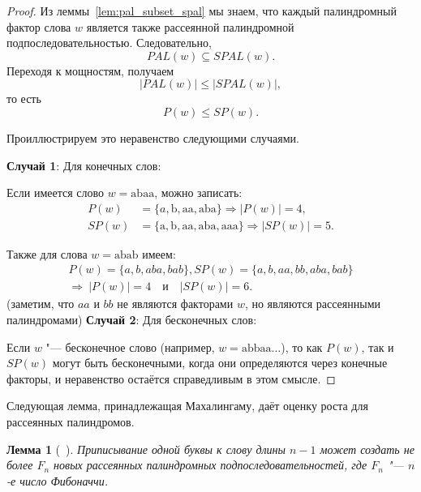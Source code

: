 \documentclass[a4paper,14pt]{extreport}
\theoremstyle{plain}
\newtheorem{lemma}{Лемма}[section]
\theoremstyle{definition}
\theoremstyle{remark}
\begin{document}
\begin{proof}
	Из леммы~\ref{lem:pal_subset_spal} мы знаем, что каждый палиндромный фактор слова $w$ является также рассеянной палиндромной подпоследовательностью. Следовательно,
	\begin{equation}
		PAL(w) \subseteq SPAL(w).
	\end{equation}
	Переходя к мощностям, получаем
	\begin{equation}
		|PAL(w)| \leq |SPAL(w)|,
	\end{equation}
	то есть
	\begin{equation}
		P(w) \leq SP(w).
	\end{equation}
	
	Проиллюстрируем это неравенство следующими случаями.
	
	\textbf{Случай 1}: Для конечных слов:
	
	Если имеется слово $w=\mathrm{abaa}$, можно записать:
	\begin{equation}
		\begin{aligned}
			P(w)&=\{a, \mathrm{b}, \mathrm{aa}, \mathrm{aba}\} \Rightarrow |P(w)|=4,\\
			SP(w)&=\{\mathrm{a}, \mathrm{b}, \mathrm{aa}, \mathrm{aba}, \mathrm{aaa}\} \Rightarrow |SP(w)|=5.
		\end{aligned}
	\end{equation}
	
	Также для слова $w=\mathrm{abab}$ имеем:
	\begin{equation}
		\begin{aligned}
			P(w)=\{{a}, {b}, {aba}, {bab}\} ,	
			SP(w)=\{{a}, {b}, {aa}, {bb}, {aba}, {bab}\} \\
			\Rightarrow\ |P(w)|=4 \quad \text{и} \quad |SP(w)|=6.
		\end{aligned}
	\end{equation}
	(заметим, что $aa$ и $bb$ не являются факторами $w$, но являются рассеянными палиндромами)
	\textbf{Случай 2}: Для бесконечных слов:
	
	Если $w$ "--- бесконечное слово (например, $w=\mathrm{abbaa\ldots}$), то как $P(w)$, так и $SP(w)$ могут быть бесконечными, когда они определяются через конечные факторы, и неравенство остаётся справедливым в этом смысле.
\end{proof}

Следующая лемма, принадлежащая Махалингаму, даёт оценку роста для рассеянных палиндромов. 

\begin{lemma}[~\cite{Mahalingam}] Приписывание одной буквы к слову длины $n-1$ может создать не более $F_n$ новых рассеянных палиндромных подпоследовательностей, где $F_n$ "--- $n$-е число Фибоначчи. \end{lemma}
\end{document}
